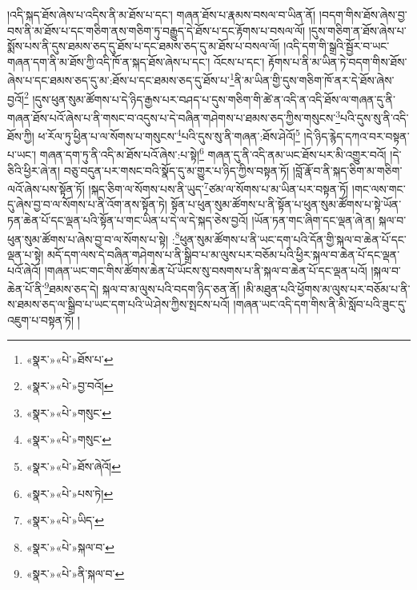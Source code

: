 །འདི་སྐད་ཐོས་ཞེས་པ་འདིས་ནི་མ་ཐོས་པ་དང་། གཞན་ཐོས་པ་རྣམས་བསལ་བ་ཡིན་ནོ། །བདག་གིས་ཐོས་ཞེས་བྱ་བས་ནི་མ་ཐོས་པ་དང་གཅིག་ནས་གཅིག་ཏུ་བརྒྱུད་དེ་ཐོས་པ་དང་རྟོགས་པ་བསལ་ལོ། །དུས་གཅིག་ན་ཐོས་ཞེས་པ་སྨོས་པས་ནི་དུས་ཐམས་ཅད་དུ་ཐོས་པ་དང་ཐམས་ཅད་དུ་མ་ཐོས་པ་བསལ་ལོ། །འདི་དག་གི་སྒྲའི་སྦྱོར་བ་ཡང་གཞན་དག་ནི་མ་ཐོས་ཀྱི་འདི་ཁོ་ན་སྐད་ཐོས་ཞེས་པ་དང་། འོངས་པ་དང་། རྟོགས་པ་ནི་མ་ཡིན་ཏེ་བདག་གིས་ཐོས་ཞེས་པ་དང་ཐམས་ཅད་དུ་མ་:ཐོས་པ་དང་ཐམས་ཅད་དུ་ཐོས་པ་\footnote{«སྣར་»«པེ་»ཐོས་པ་}ནི་མ་ཡིན་གྱི་དུས་གཅིག་ཁོ་ནར་དེ་ཐོས་ཞེས་བྱའོ།\footnote{«སྣར་»«པེ་»བྱ་བའོ།} །དུས་ཕུན་སུམ་ཚོགས་པ་དེ་ཉིད་རྒྱས་པར་བཤད་པ་དུས་གཅིག་གི་ཚེ་ན་འདི་ན་འདི་ཐོས་ལ་གཞན་དུ་ནི་གཞན་ཐོས་པའོ་ཞེས་པ་ནི་གསང་བ་འདུས་པ་དེ་བཞིན་གཤེགས་པ་ཐམས་ཅད་ཀྱིས་གསུངས་\footnote{«སྣར་»«པེ་»གསུང་}པའི་དུས་སུ་ནི་འདི་ཐོས་ཀྱི། ཕ་རོལ་ཏུ་ཕྱིན་པ་ལ་སོགས་པ་གསུངས་\footnote{«སྣར་»«པེ་»གསུང་}པའི་དུས་སུ་ནི་གཞན་:ཐོས་ཤེའོ།\footnote{«སྣར་»«པེ་»ཐོས་ཞེའོ།} །དེ་ཉིད་རྙེད་དཀའ་བར་བསྟན་པ་ཡང་། གཞན་དག་ཏུ་ནི་འདི་མ་ཐོས་པའོ་ཞེས་:པ་སྟེ།\footnote{«སྣར་»«པེ་»པས་ཏེ།} གཞན་དུ་ནི་འདི་ནམ་ཡང་ཐོས་པར་མི་འགྱུར་བའོ། །དེ་ཅིའི་ཕྱིར་ཞེ་ན། བཅུ་བདུན་པར་གསང་བའི་སྣོད་དུ་མ་གྱུར་པ་ཉིད་ཀྱིས་བསྟན་ཏོ། །བློ་རྣོ་བ་ནི་སྐད་ཅིག་མ་གཅིག་ལའོ་ཞེས་པས་སྟོན་ཏོ། །སྐད་ཅིག་ལ་སོགས་པས་ནི་ཡུད་\footnote{«སྣར་»«པེ་»ཡིད་}ཙམ་ལ་སོགས་པ་མ་ཡིན་པར་བསྟན་ཏོ། །གང་ལས་གང་དུ་ཞེས་བྱ་བ་ལ་སོགས་པ་ནི་འོག་ནས་སྟོན་ཏེ། སྟོན་པ་ཕུན་སུམ་ཚོགས་པ་ནི་སྟོན་པ་ཕུན་སུམ་ཚོགས་པ་སྟེ་ཡོན་ཏན་ཆེན་པོ་དང་ལྡན་པའི་སྟོན་པ་གང་ཡིན་པ་དེ་ལ་དེ་སྐད་ཅེས་བྱའོ། །ཡོན་ཏན་གང་ཞིག་དང་ལྡན་ཞེ་ན། སྐལ་བ་ཕུན་སུམ་ཚོགས་པ་ཞེས་བྱ་བ་ལ་སོགས་པ་སྟེ། :\footnote{«སྣར་»«པེ་»སྐལ་བ་}ཕུན་སུམ་ཚོགས་པ་ནི་ཡང་དག་པའི་དོན་གྱི་སྐལ་བ་ཆེན་པོ་དང་ལྡན་པ་སྟེ། མདོ་དག་ལས་དེ་བཞིན་གཤེགས་པ་ནི་སྒྲིབ་པ་མ་ལུས་པར་བཅོམ་པའི་ཕྱིར་སྐལ་བ་ཆེན་པོ་དང་ལྡན་པའོ་ཞེའོ། །གཞན་ཡང་གང་གིས་ཚོགས་ཆེན་པོ་ཡོངས་སུ་བསགས་པ་ནི་སྐལ་བ་ཆེན་པོ་དང་ལྡན་པའོ། །སྐལ་བ་ཆེན་པོ་ནི་\footnote{«སྣར་»«པེ་»ནི་སྐལ་བ་}ཐམས་ཅད་དེ། སྐལ་བ་མ་ལུས་པའི་བདག་ཉིད་ཅན་ནོ། །མི་མཐུན་པའི་ཕྱོགས་མ་ལུས་པར་བཅོམ་པ་ནི་ས་ཐམས་ཅད་ལ་སྒྲིབ་པ་ཡང་དག་པའི་ཡེ་ཤེས་ཀྱིས་སྤངས་པའོ། །གཞན་ཡང་འདི་དག་གིས་ནི་མི་སློབ་པའི་ཟུང་དུ་འཇུག་པ་བསྟན་ཏོ། །
